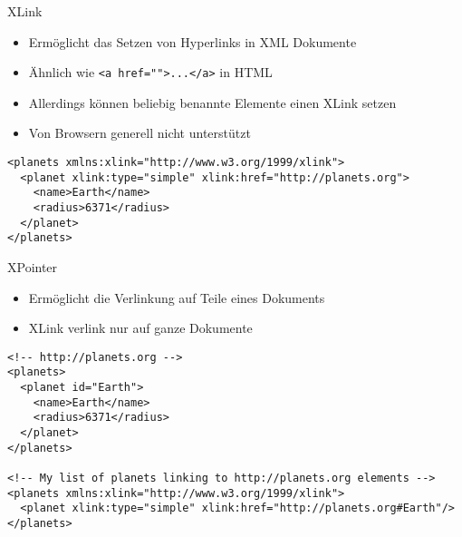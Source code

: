 \documentclass{beamer}
\begin{document}
\begin{frame}[fragile]{XLink}
	
	\begin{itemize}
		\item Ermöglicht das Setzen von Hyperlinks in XML Dokumente
		\item Ähnlich wie \texttt{<a href="">...</a>} in HTML
		\item Allerdings können beliebig benannte Elemente einen XLink setzen
		\item Von Browsern generell nicht unterstützt
	\end{itemize}
	
	\vspace{0.5cm}
	
	\lstset{language=XML}\small
	\begin{lstlisting}
<planets xmlns:xlink="http://www.w3.org/1999/xlink">
  <planet xlink:type="simple" xlink:href="http://planets.org">
    <name>Earth</name>
    <radius>6371</radius>
  </planet>
</planets>
	\end{lstlisting}
	
\end{frame}

\begin{frame}[fragile]{XPointer}
	
	\begin{itemize}
		\item Ermöglicht die Verlinkung auf Teile eines Dokuments
		\item XLink verlink nur auf ganze Dokumente
	\end{itemize}
	
	\vspace{0.5cm}
	
	\lstset{language=XML}\footnotesize
	\begin{lstlisting}
<!-- http://planets.org -->
<planets>
  <planet id="Earth">
    <name>Earth</name>
    <radius>6371</radius>
  </planet>
</planets>

<!-- My list of planets linking to http://planets.org elements -->
<planets xmlns:xlink="http://www.w3.org/1999/xlink">
  <planet xlink:type="simple" xlink:href="http://planets.org#Earth"/>
</planets>
	\end{lstlisting}
	
\end{frame}
\end{document}
